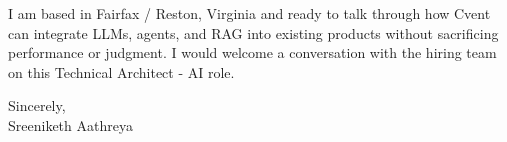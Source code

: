 \documentclass[11pt, letterpaper]{article}
\begin{document}
I am based in Fairfax / Reston, Virginia and ready to talk through how Cvent can integrate LLMs, agents, and RAG into existing products without sacrificing performance or judgment. I would welcome a conversation with the hiring team on this Technical Architect - AI role.

Sincerely,\\[12pt]
Sreeniketh Aathreya
\end{document}
